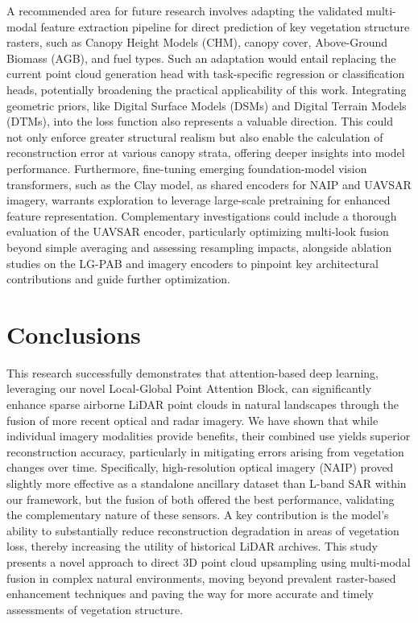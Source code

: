 \documentclass[preprints,article,accept,pdftex,moreauthors]{Definitions/mdpi}
\begin{document}
A recommended area for future research involves adapting the validated multi-modal feature extraction pipeline for direct prediction of key vegetation structure rasters, such as Canopy Height Models (CHM), canopy cover, Above-Ground Biomass (AGB), and fuel types. Such an adaptation would entail replacing the current point cloud generation head with task-specific regression or classification heads, potentially broadening the practical applicability of this work. Integrating geometric priors, like Digital Surface Models (DSMs) and Digital Terrain Models (DTMs), into the loss function also represents a valuable direction. This could not only enforce greater structural realism but also enable the calculation of reconstruction error at various canopy strata, offering deeper insights into model performance. Furthermore, fine-tuning emerging foundation-model vision transformers, such as the Clay model, as shared encoders for NAIP and UAVSAR imagery, warrants exploration to leverage large-scale pretraining for enhanced feature representation. Complementary investigations could include a thorough evaluation of the UAVSAR encoder, particularly optimizing multi-look fusion beyond simple averaging and assessing resampling impacts, alongside ablation studies on the LG-PAB and imagery encoders to pinpoint key architectural contributions and guide further optimization.


\section{Conclusions}

This research successfully demonstrates that attention-based deep learning, leveraging our novel Local-Global Point Attention Block, can significantly enhance sparse airborne LiDAR point clouds in natural landscapes through the fusion of more recent optical and radar imagery. We have shown that while individual imagery modalities provide benefits, their combined use yields superior reconstruction accuracy, particularly in mitigating errors arising from vegetation changes over time. Specifically, high-resolution optical imagery (NAIP) proved slightly more effective as a standalone ancillary dataset than L-band SAR within our framework, but the fusion of both offered the best performance, validating the complementary nature of these sensors. A key contribution is the model's ability to substantially reduce reconstruction degradation in areas of vegetation loss, thereby increasing the utility of historical LiDAR archives. This study presents a novel approach to direct 3D point cloud upsampling using multi-modal fusion in complex natural environments, moving beyond prevalent raster-based enhancement techniques and paving the way for more accurate and timely assessments of vegetation structure.
\end{document}

